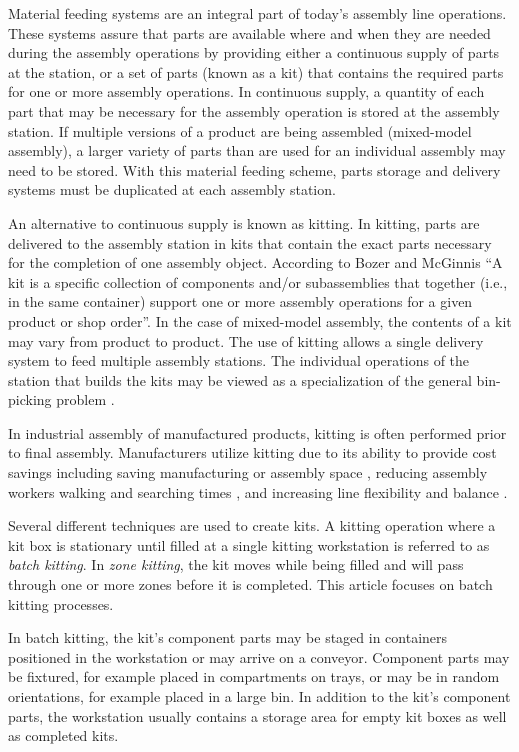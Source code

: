 
Material feeding systems are an integral part of today's assembly line operations.
These systems assure that parts are available where and when
they are needed during the assembly operations by providing either a continuous
supply of parts at the station, or a set of parts (known
as a kit) that contains the required parts for one or more assembly operations.
In continuous supply, a quantity of each part that
may be necessary for the assembly operation is stored at the assembly station.
If multiple versions of a product are being assembled (mixed-model assembly),
a larger variety of parts than are used for an individual assembly may need
to be stored. With this material feeding scheme, parts
storage and delivery systems must be duplicated at each assembly station.

An alternative to continuous supply is known as kitting. In kitting,
parts are delivered to the assembly station in kits that contain
the exact parts necessary for the completion of one assembly object.
According to Bozer and McGinnis \cite{Bozer1992} ``A kit is a specific
collection of components and/or subassemblies that together
(i.e., in the same container) support one or more assembly
operations for a given product or shop order''. In the case of mixed-model
assembly, the contents of a kit may vary from product to product.
The use of kitting allows a single delivery system to feed
multiple assembly stations. The individual operations of the station that
builds the kits may be viewed as a specialization of the general
bin-picking problem \cite{Schyja2012}.

In industrial assembly of manufactured products, kitting is
often performed prior to final assembly. Manufacturers utilize kitting
due to its ability to provide cost savings \cite{Carlsson_2008}
including saving manufacturing or assembly space \cite{Medbo2003},
reducing assembly workers walking and searching times \cite{Schwind1992},
and increasing line flexibility \cite{Bozer1992} and balance \cite{Jiao2000}.

Several different techniques are used to create kits. A kitting
operation where a kit box is stationary until filled at a single
kitting workstation is referred to as {\it batch kitting}.
In {\it zone kitting}, the kit moves while being filled and will pass through one or
more zones before it is completed. This article focuses on batch kitting processes.

In batch kitting, the kit's component parts may be staged in
containers positioned in the workstation or may arrive on a conveyor.
Component parts may be fixtured, for example placed in compartments
on trays, or may be in random orientations, for example
placed in a large bin. In addition to the kit's component parts,
the workstation usually contains a storage area for empty kit boxes as
well as completed kits.

